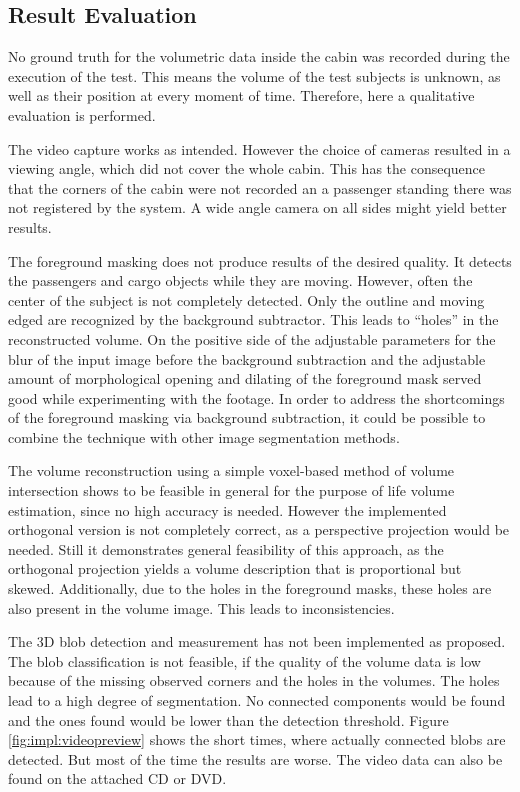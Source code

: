 \subsection{Result Evaluation}
No ground truth for the volumetric data inside the cabin was recorded during the execution of the test.
This means the volume of the test subjects is unknown, as well as their position at every moment of time.
Therefore, here a qualitative evaluation is performed. 

The video capture works as intended.
However the choice of cameras resulted in a viewing angle, which did not cover the whole cabin.
This has the consequence that the corners of the cabin were not recorded an a passenger standing there was not registered by the system.
A wide angle camera on all sides might yield better results.

The foreground masking does not produce results of the desired quality.
It detects the passengers and cargo objects while they are moving.
However, often the center of the subject is not completely detected.
Only the outline and moving edged are recognized by the background subtractor.
This leads to \enquote{holes} in the reconstructed volume.
On the positive side of the adjustable parameters for the blur of the input image before the background subtraction and the adjustable amount of morphological opening and dilating of the foreground mask served good while experimenting with the footage.
In order to address the shortcomings of the foreground masking via background subtraction,
it could be possible to combine the technique with other image segmentation methods.

The volume reconstruction using a simple voxel-based method of volume intersection shows to be feasible in general for the purpose of life volume estimation, since no high accuracy is needed.
However the implemented orthogonal version is not completely correct, as a perspective projection would be needed.
Still it demonstrates general feasibility of this approach, 
as the orthogonal projection yields a volume description that is proportional but skewed.
Additionally, due to the holes in the foreground masks, these holes are also present in the volume image. 
This leads to inconsistencies.

The \ac{3D} blob detection and measurement has not been implemented as proposed.
The blob classification is not feasible, if the quality of the volume data is low because of the missing observed corners and the holes in the volumes.
The holes lead to a high degree of segmentation. No connected components would be found and the ones found would be lower than the detection threshold.
Figure \ref{fig:impl:videopreview} shows the short times, where actually connected blobs are detected. But most of the time the results are worse.
The video data can also be found on the attached CD or DVD.

